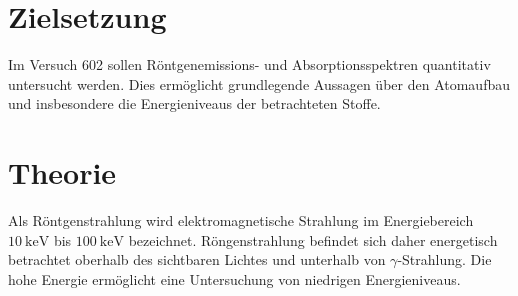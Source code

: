 \setcounter{page}{1}
\section*{Zielsetzung}
Im Versuch 602 sollen Röntgenemissions- und Absorptionsspektren quantitativ untersucht werden.
Dies ermöglicht grundlegende Aussagen über den Atomaufbau und insbesondere die Energieniveaus
der betrachteten Stoffe.
\section{Theorie}
Als Röntgenstrahlung wird elektromagnetische Strahlung im Energiebereich $\SI{10}{\kilo\eV}$
bis $\SI{100}{\kilo\eV}$ bezeichnet. Röngenstrahlung befindet sich daher energetisch betrachtet oberhalb des sichtbaren Lichtes und
unterhalb von $\gamma$-Strahlung. Die hohe Energie ermöglicht eine Untersuchung von niedrigen Energieniveaus.
